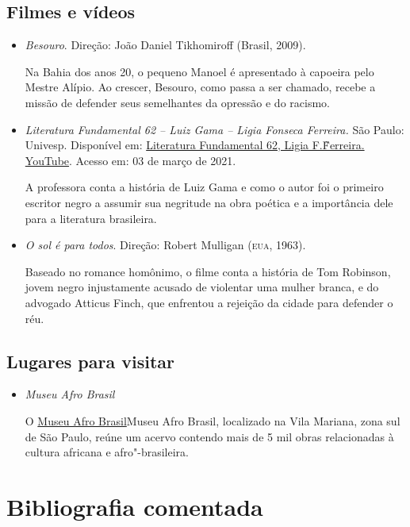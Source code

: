 \documentclass[12pt]{extarticle}
\begin{document}
\subsection{Filmes e vídeos}
\begin{itemize}
\item\textit{Besouro}. Direção: João Daniel Tikhomiroff (Brasil, 2009).

Na Bahia dos anos 20, o pequeno Manoel é apresentado à capoeira pelo
Mestre Alípio. Ao crescer, Besouro, como passa a ser chamado, recebe a
missão de defender seus semelhantes da opressão e do racismo.

\item\textit{Literatura Fundamental 62 -- Luiz Gama -- Ligia
Fonseca Ferreira.} São Paulo: Univesp. Disponível em:
\href{https://www.youtube.com/watch?v=WqSuNcU2jdA}{Literatura
Fundamental 62, Ligia F.\~Ferreira. YouTube}. Acesso
em: 03 de março de 2021.

A professora conta a história de Luiz Gama e como o autor foi o primeiro
escritor negro a assumir sua negritude na obra poética e a importância
dele para a literatura brasileira.

\item\textit{O sol é para todos}. Direção: Robert Mulligan (\textsc{eua}, 1963).

Baseado no romance homônimo, o filme conta a história de Tom Robinson,
jovem negro injustamente acusado de violentar uma mulher branca, e do
advogado Atticus Finch, que enfrentou a rejeição da cidade para defender
o réu.

\end{itemize}

\subsection{Lugares para visitar}

\begin{itemize}
\item\textit{Museu Afro Brasil}

O \href{http://www.museuafrobrasil.org.br/}{Museu Afro Brasil}{Museu Afro Brasil}, localizado na Vila Mariana, zona sul de São Paulo, reúne um
acervo contendo mais de 5 mil obras relacionadas à cultura africana e
afro"-brasileira.
\end{itemize}


\section{Bibliografia comentada}
\end{document}

